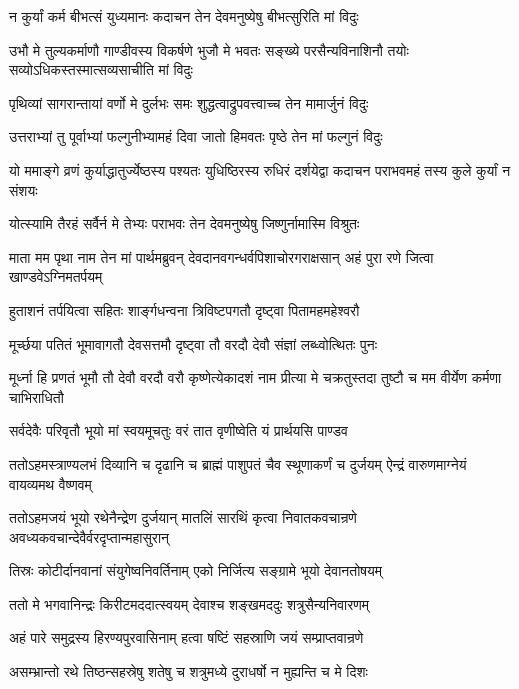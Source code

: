 \twolineshloka
{न कुर्यां कर्म बीभत्सं युध्यमानः कदाचन}
{तेन देवमनुष्येषु बीभत्सुरिति मां विदुः}


\threelineshloka
{उभौ मे तुल्यकर्माणौ गाण्डीवस्य विकर्षणे}
{भुजौ मे भवतः सङ्ख्ये परसैन्यविनाशिनौ}
{तयोः सव्योऽधिकस्तस्मात्सव्यसाचीति मां विदुः}


\twolineshloka
{पृथिव्यां सागरान्तायां वर्णो मे दुर्लभः समः}
{शुद्धत्वाद्रुपवत्त्वाच्च तेन मामार्जुनं विदुः}


\twolineshloka
{उत्तराभ्यां तु पूर्वाभ्यां फल्गुनीभ्यामहं दिवा}
{जातो हिमवतः पृष्ठे तेन मां फल्गुनं विदुः}


\threelineshloka
{यो ममाङ्गे व्रणं कुर्याद्धातुर्ज्येष्ठस्य पश्यतः}
{युधिष्ठिरस्य रुधिरं दर्शयेद्वा कदाचन}
{पराभवमहं तस्य कुले कुर्यां न संशयः}


\twolineshloka
{योत्स्यामि तैरहं सर्वैर्न मे तेभ्यः पराभवः}
{तेन देवमनुष्येषु जिष्णुर्नामास्मि विश्रुतः}


\onelineshloka
{माता मम पृथा नाम तेन मां पार्थमब्रुवन्}
\twolineshloka
{देवदानवगन्धर्वपिशाचोरगराक्षसान्}
{अहं पुरा रणे जित्वा खाण्डवेऽग्निमतर्पयम्}


\twolineshloka
{हुताशनं तर्पयित्वा सहितः शार्ङ्गधन्वना}
{त्रिविष्टपगतौ दृष्ट्वा पितामहमहेश्वरौ}


\twolineshloka
{मूर्च्छया पतितं भूमावागतौ देवसत्तमौ}
{दृष्ट्वा तौ वरदौ देवौ संज्ञां लब्ध्वोत्थितः पुनः}


\threelineshloka
{मूर्ध्ना हि प्रणतं भूमौ तौ देवौ वरदौ वरौ}
{कृष्णेत्येकादशं नाम प्रीत्या मे चक्रतुस्तदा}
{तुष्टौ च मम वीर्येण कर्मणा चाभिराधितौ}


\twolineshloka
{सर्वदेवैः परिवृतौ भूयो मां स्वयमूचतुः}
{वरं तात वृणीष्वेति यं प्रार्थयसि पाण्डव}


\threelineshloka
{ततोऽहमस्त्राण्यलभं दिव्यानि च दृढानि च}
{ब्राह्मं पाशुपतं चैव स्थूणाकर्णं च दुर्जयम्}
{ऐन्द्रं वारुणमाग्नेयं वायव्यमथ वैष्णवम्}


\threelineshloka
{ततोऽहमजयं भूयो रथेनैन्द्रेण दुर्जयान्}
{मातलिं सारथिं कृत्वा निवातकवचान्रणे}
{अवध्यकवचान्देवैर्वरदृप्तान्महासुरान्}


\twolineshloka
{तिस्रः कोटीर्दानवानां संयुगेष्वनिवर्तिनाम्}
{एको निर्जित्य सङ्ग्रामे भूयो देवानतोषयम्}


\twolineshloka
{ततो मे भगवानिन्द्रः किरीटमददात्स्वयम्}
{देवाश्च शङ्खमददुः शत्रुसैन्यनिवारणम्}


\twolineshloka
{अहं पारे समुद्रस्य हिरण्यपुरवासिनाम्}
{हत्वा षष्टिं सहस्राणि जयं सम्प्राप्तवान्रणे}


\twolineshloka
{असम्भ्रान्तो रथे तिष्ठन्सहस्रेषु शतेषु च}
{शत्रुमध्ये दुराधर्षो न मुह्यन्ति च मे दिशः}


